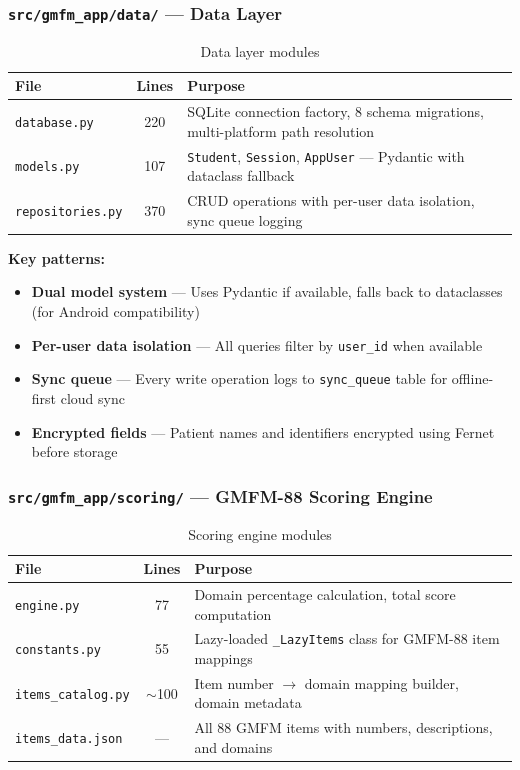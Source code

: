 \documentclass[12pt,a4paper]{article}
\begin{document}
\subsubsection{\texttt{src/gmfm\_app/data/} --- Data Layer}

\begin{table}[H]
\centering
\renewcommand{\arraystretch}{1.3}
\begin{tabularx}{\textwidth}{l c X}
\toprule
\textbf{File} & \textbf{Lines} & \textbf{Purpose} \\
\midrule
\texttt{database.py}     & 220 & SQLite connection factory, 8 schema migrations, multi-platform path resolution \\
\texttt{models.py}       & 107 & \texttt{Student}, \texttt{Session}, \texttt{AppUser} --- Pydantic with dataclass fallback \\
\texttt{repositories.py} & 370 & CRUD operations with per-user data isolation, sync queue logging \\
\bottomrule
\end{tabularx}
\caption{Data layer modules}
\end{table}

\textbf{Key patterns:}
\begin{itemize}[leftmargin=2em]
    \item \textbf{Dual model system} --- Uses Pydantic if available, falls back to dataclasses (for Android compatibility)
    \item \textbf{Per-user data isolation} --- All queries filter by \texttt{user\_id} when available
    \item \textbf{Sync queue} --- Every write operation logs to \texttt{sync\_queue} table for offline-first cloud sync
    \item \textbf{Encrypted fields} --- Patient names and identifiers encrypted using Fernet before storage
\end{itemize}

\subsubsection{\texttt{src/gmfm\_app/scoring/} --- GMFM-88 Scoring Engine}

\begin{table}[H]
\centering
\renewcommand{\arraystretch}{1.3}
\begin{tabularx}{\textwidth}{l c X}
\toprule
\textbf{File} & \textbf{Lines} & \textbf{Purpose} \\
\midrule
\texttt{engine.py}         & 77    & Domain percentage calculation, total score computation \\
\texttt{constants.py}      & 55    & Lazy-loaded \texttt{\_LazyItems} class for GMFM-88 item mappings \\
\texttt{items\_catalog.py} & $\sim$100 & Item number $\rightarrow$ domain mapping builder, domain metadata \\
\texttt{items\_data.json}  & ---   & All 88 GMFM items with numbers, descriptions, and domains \\
\bottomrule
\end{tabularx}
\caption{Scoring engine modules}
\end{table}
\end{document}
